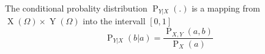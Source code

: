 The conditional probality distribution $\operatorname{P}_{Y | X}(.)$ is a mapping from $\operatorname{X}(\Omega) \times \operatorname{Y}(\Omega)$ into the intervall $[0, 1]$
$$\operatorname{P}_{Y | X}(b | a) = \frac{\operatorname{P}_{X,Y}(a, b)}{\operatorname{P}_X(a)}$$
